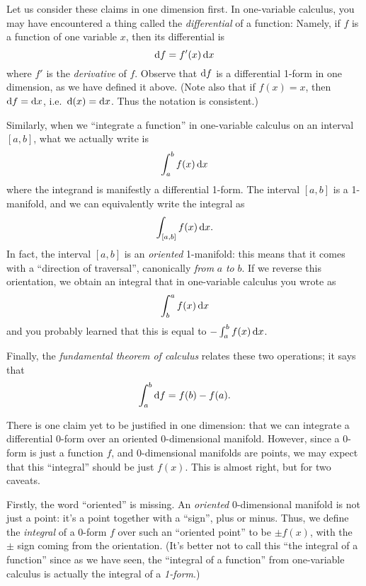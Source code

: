 \documentclass[12pt]{amsart}
\begin{document}
Let us consider these claims in one dimension first.
In one-variable calculus, you may have encountered a thing called the \emph{differential} of a function:
Namely, if $f$ is a function of one variable $x$, then its differential is
\begin{equation}
  {\ensuremath{\mathrm{d} f}} = f'(x) \, {\mathrm{d} x}\label{eq:onevariable-differential}
\end{equation}
where $f'$ is the \emph{derivative} of $f$.
Observe that ${\mathrm{d} f}$ is a differential 1-form in one dimension, as we have defined it above.
(Note also that if $f(x) = x$, then ${\mathrm{d} f} = {\mathrm{d} x}$, i.e.\ $\mathrm{d}(x) = {\mathrm{d} x}$.
Thus the notation is consistent.)

Similarly, when we ``integrate a function'' in one-variable calculus on an interval $[a,b]$, what we actually write is
\[ \int_a^b f(x) \,{\mathrm{d} x} \]
where the integrand is manifestly a differential 1-form.
The interval $[a,b]$ is a 1-manifold, and we can equivalently write the integral as 
\[ \int_{[a,b]} f(x) \,{\mathrm{d} x}. \]
In fact, the interval $[a,b]$ is an \emph{oriented} 1-manifold: this means that it comes with a ``direction of traversal'', canonically \emph{from} $a$ \emph{to} $b$.
If we reverse this orientation, we obtain an integral that in one-variable calculus you wrote as
\[ \int_b^a f(x) \,{\mathrm{d} x} \]
and you probably learned that this is equal to $-\int_a^b f(x) \,{\mathrm{d} x}$.

Finally, the \emph{fundamental theorem of calculus} relates these two operations; it says that
\begin{equation}
  \int_a^b {\mathrm{d} f} = f(b) - f(a).\label{eq:onevar-ftc}
\end{equation}

There is one claim yet to be justified in one dimension: that we can integrate a differential 0-form over an oriented $0$-dimensional manifold.
However, since a 0-form is just a function $f$, and $0$-dimensional manifolds are points, we may expect that this ``integral'' should be just $f(x)$.
This is almost right, but for two caveats.

Firstly, the word ``oriented'' is missing.
An \emph{oriented} $0$-dimensional manifold is not just a point: it's a point together with a ``sign'', plus or minus.
Thus, we define the \emph{integral} of a 0-form $f$ over such an ``oriented point'' to be $\pm f(x)$, with the $\pm$ sign coming from the orientation.
(It's better not to call this ``the integral of a function'' since as we have seen, the ``integral of a function'' from one-variable calculus is actually the integral of a \emph{1-form}.)
\end{document}
